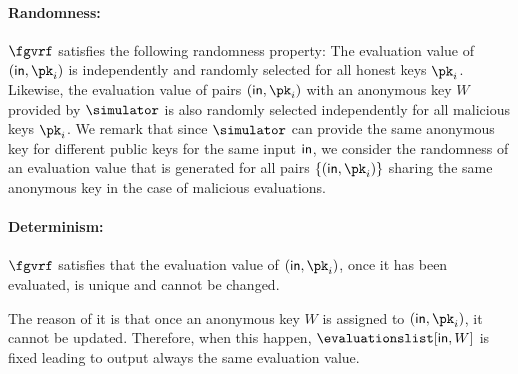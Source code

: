 	\paragraph{Randomness:} $ \fgvrf $  satisfies the following randomness property: The evaluation value of $ (\msg, \pk_i) $ is independently and randomly selected for all honest keys $\pk_i$.
	Likewise, the evaluation value of pairs ${(\msg, \pk_i)}$ with an anonymous key $W$ provided by $\simulator$ is also randomly selected independently for all malicious keys $\pk_i$.  We remark that since $ \simulator $ can provide the same anonymous key for different public keys for the same input $ \mathsf{in} $, we consider the randomness of an evaluation value that is generated for all pairs $ \{(\msg, \pk_i)\} $ sharing the same anonymous key in the case of malicious evaluations.
	
	
	
	
	
	
	\paragraph{Determinism:} $ \fgvrf $  satisfies that the evaluation value  of $ (\msg, \pk_i) $, once it has been evaluated, is unique and  cannot be changed. 
	
	The reason of it is that once an anonymous key $ W $ is assigned to $ (\msg, \pk_i) $, it cannot be updated. Therefore, when this happen, $ \evaluationslist[\msg, W] $ is fixed leading to output always the same evaluation value.
	
